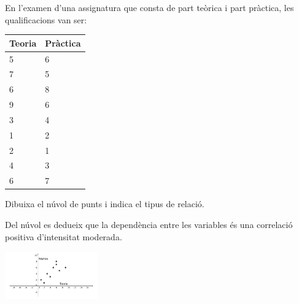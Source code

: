 \begin{resolt}[E]{
En l'examen d'una assignatura que consta de part teòrica i part pràctica, les qualificacions van ser:
\vspace{0.25cm}

\begin{tabular}{|p{0.7in}|p{0.7in}|}
	 
\textbf{Teoria} & \textbf{Pràctica} \\ \hline
5 & 6\\ \hline
7 & 5 \\ \hline
6 & 8 \\ \hline
9 & 6\\ \hline
3 & 4\\ \hline
1 & 2\\ \hline
2 & 1\\ \hline
4 & 3\\ \hline
6 & 7\\ \hline 
\end{tabular}
\vspace{0.25cm}

 Dibuixa el núvol de punts i indica el tipus de relació.
}
 

Del núvol es dedueix que la dependència entre les variables és una correlació positiva d'intensitat moderada.

\begin{center}
	\includegraphics[width=0.3\textwidth]{img-11/nuvol-eg}
\end{center}

\end{resolt}
\vspace{0.5cm}

